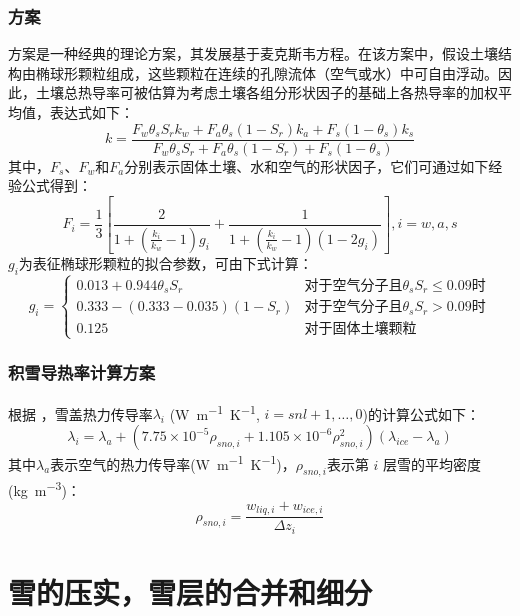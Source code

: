 \subsubsection{\citet{de1963thermal}方案}
\citet{de1963thermal}方案是一种经典的理论方案，其发展基于麦克斯韦方程。在该方案中，假设土壤结构由椭球形颗粒组成，这些颗粒在连续的孔隙流体（空气或水）中可自由浮动。因此，土壤总热导率可被估算为考虑土壤各组分形状因子的基础上各热导率的加权平均值，表达式如下：$$k=\frac{F_w\theta_sS_rk_w+F_a\theta_s\left(1-S_r\right)k_a+F_s\left(1-\theta_s\right)k_s}{F_w\theta_sS_r+F_a\theta_s\left(1-S_r\right)+F_s\left(1-\theta_s\right)}$$
其中，$F_s$、$F_w$和$F_a$分别表示固体土壤、水和空气的形状因子，它们可通过如下经验公式得到：
\begin{equation}
F_i=\frac{1}{3}\left[\frac{2}{1+\left(\frac{k_i}{k_w}-1\right)g_i}+\frac{1}{1+\left(\frac{k_i}{k_w}-1\right)(1-2g_i)}\right], i=w,a,s
\end{equation}
$g_i$为表征椭球形颗粒的拟合参数，可由下式计算：
\begin{equation}
g_i=\begin{cases}
0.013+0.944\theta_sS_r  & \text{对于空气分子且}\theta_sS_r\leq 0.09 \text{时} \\ 
0.333-\left(0.333-0.035\right)\left(1-S_r\right) & \text{对于空气分子且}\theta_sS_r>0.09\text{时} \\
0.125 &\text{对于固体土壤颗粒}
\end{cases}
\end{equation}

\subsubsection{积雪导热率计算方案}
根据 \citet{jordan1991one}，雪盖热力传导率$\lambda_i$ (\unit{W.m^{-1}.K^{-1}}, $i=snl+1,\ldots,0$)的计算公式如下：
\begin{equation}
\lambda_{i}=\lambda_{a}+\left(7.75 \times 10^{-5} \rho_{sno, i}+1.105 \times 10^{-6} \rho_{sno, i}^{2}\right)\left(\lambda_{ice}-\lambda_{a}\right)
\end{equation}
其中$\lambda_a$表示空气的热力传导率(\unit{W.m^{-1}.K^{-1}})，$\rho_{sno,i}$表示第 $i$ 层雪的平均密度(\unit{kg.m^{-3}})：
\begin{equation}
\rho_{sno, i}=\frac{w_{liq, i}+w_{ice, i}}{\Delta z_{i}}
\end{equation}

\section{雪的压实，雪层的合并和细分}



